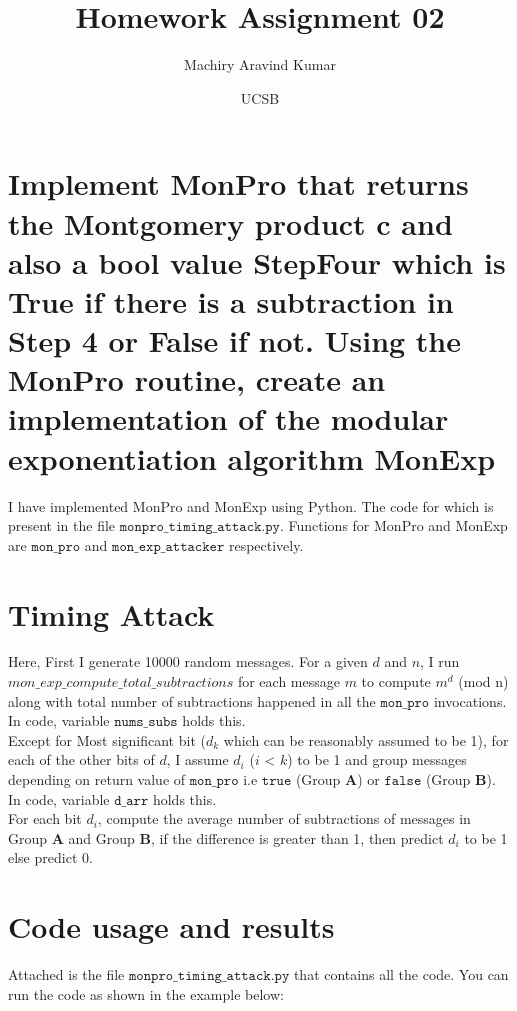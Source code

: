 \documentclass[11pt, pdftex]{article}
\title{Homework Assignment 02}
\author{Machiry Aravind Kumar}
\date{UCSB}
\begin{document}
\maketitle
\section{Implement MonPro that returns the Montgomery product c and also a bool value StepFour which is True if there is a subtraction in Step 4 or False if not. Using the MonPro routine, create an implementation of the modular exponentiation algorithm MonExp}
I have implemented MonPro and MonExp using Python. The code for which is present in the file $\texttt{monpro\_timing\_attack.py}$. Functions for MonPro and MonExp are $\texttt{mon\_pro}$ and $\texttt{mon\_exp\_attacker}$ respectively.
\section{Timing Attack}
Here, First I generate 10000 random messages. For a given $d$ and $n$, I run $mon\_exp\_compute\_total\_subtractions$  for each message $m$ to compute $m^{d}$ (mod n) along with total number of subtractions happened in all the $\texttt{mon\_pro}$ invocations. In code, variable $\texttt{nums\_subs}$ holds this.\\
Except for Most significant bit ($d_{k}$ which can be reasonably assumed to be 1), for each of the other bits of $d$, I assume $d_{i}$ ($i$ < $k$) to be 1 and group messages depending on return value of $\texttt{mon\_pro}$ i.e $\texttt{true}$ (Group $\textbf{A}$) or $\texttt{false}$ (Group $\textbf{B}$). In code, variable $\texttt{d\_arr}$ holds this.\\
For each bit $d_{i}$, compute the average number of subtractions of messages in Group $\textbf{A}$ and Group $\textbf{B}$, if the difference is greater than 1, then predict $d_{i}$ to be 1 else predict 0.
\section{Code usage and results}
Attached is the file $\texttt{monpro\_timing\_attack.py}$ that contains all the code. You can run the code as shown in the example below:
\end{document}
